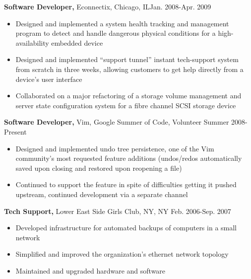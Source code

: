 \documentclass[line,overlapped]{res}
\begin{document}
\begin{resume}
{\bf Software Developer,} Econnectix, Chicago, IL\hfill Jan. 2008-Apr. 2009
\begin{itemize} \itemsep -2pt %
    \item Designed and implemented a system health tracking and management program to detect and handle dangerous physical conditions for a high-availability embedded device
    \item Designed and implemented ``support tunnel'' instant tech-support system from scratch in three weeks, allowing customers to get help directly from a device's user interface
    \item Collaborated on a major refactoring of a storage volume management and server state configuration system for a fibre channel SCSI storage device
\end{itemize}
\vspace{-10pt}

{\bf Software Developer,} Vim, Google Summer of Code, Volunteer \hfill Summer 2008-Present
\begin{itemize} \itemsep -2pt
    \item Designed and implemented undo tree persistence, one of the Vim community's most requested feature additions (undos/redos automatically saved upon closing and restored upon reopening a file)
    \item Continued to support the feature in spite of difficulties getting it pushed upstream, continued development via a separate channel
\end{itemize}
\vspace{-10pt}

{\bf Tech Support,} Lower East Side Girls Club, NY, NY \hfill Feb. 2006-Sep. 2007
\begin{itemize} \itemsep -2pt
    \item Developed infrastructure for automated backups of computers in a small network
    \item Simplified and improved the organization's ethernet network topology
    \item Maintained and upgraded hardware and software
\end{itemize}


\end{resume}
\end{document}
